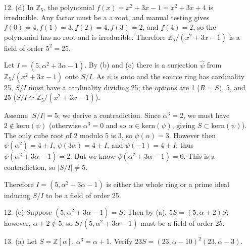 \documentclass{article}
\newcommand{\Z}[0]{\mathbb{Z}}
\newcommand{\kernel}[0]{\text{kern}}
\begin{document}
\begin{enumerate}
\begin{proof}
    Take $a \in R/\psi(I)$; then $a = r' + \psi(I)$ for $r' \in R'$.  Since $\psi$ is surjective there must be some $r \in R$ such that $\psi(r) = r'$; therefore the coset $r + I$ is mapped to $r' + \psi(I)$, and the mapping between the quotient groups is also surjective.
\end{proof}

\item[12. (d)] In $\Z_5$, the polynomial $f(x) = x^2 + 3x - 1 = x^2 + 3x + 4$ is irreducible.  Any factor must be a a root, and manual testing gives $f(0) = 4, f(1) = 3, f(2) = 4, f(3) = 2$, and $f(4) = 2$, so the polynomial has no root and is irreducible.  Therefore $\Z_5 / (x^2 + 3x - 1)$ is a field of order $5^2 = 25$.

Let $I = (5, \alpha^2 + 3\alpha - 1)$.  By (b) and (c) there is a surjection $\hat{\psi}$ from $\Z_5 / (x^2 + 3x - 1)$ onto $S / I$.  As $\hat{\psi}$ is onto and the source ring has cardinality 25, $S / I$ must have a cardinality dividing 25; the options are 1 ($R = S$), 5, and 25 ($S/I \simeq \Z_5/(x^2 + 3x - 1)$).

Assume $|S / I| = 5$; we derive a contradiction.  Since $\alpha^3 = 2$, we must have $2 \not \in \kernel(\psi)$ (otherwise $\alpha^3 = 0$ and so $\alpha \in \kernel(\psi)$, giving $S \subset \kernel(\psi)$).  The only cube root of 2 modulo 5 is 3, so $\psi(\alpha) = 3$.  However then $\psi(\alpha^2) = 4 + I$, $\psi(3\alpha) = 4 + I$, and $\psi(-1) = 4 + I$; thus $\psi(\alpha^2 + 3\alpha - 1) = 2$.  But we know $\psi(\alpha^2 + 3\alpha - 1) = 0$.  This is a contradiction, so $|S/I| \neq 5$.

Therefore $I = (5, \alpha^2 + 3\alpha - 1)$ is either the whole ring or a prime ideal inducing $S / I$ to be a field of order 25.

\item[12. (e)] Suppose $(5, \alpha^2 + 3\alpha - 1) = S$.  Then by (a), $5S = (5, \alpha + 2)S$; however, $\alpha + 2 \not\in 5$, so $S/(5, \alpha^2 + 3\alpha - 1)$ must be a field of order 25.

\item[13. (a)] Let $S = \Z[\alpha]$, $\alpha^3 = \alpha + 1$.  Verify $23S = (23, \alpha - 10)^2 (23, \alpha - 3)$.


\end{enumerate}
\end{document}
